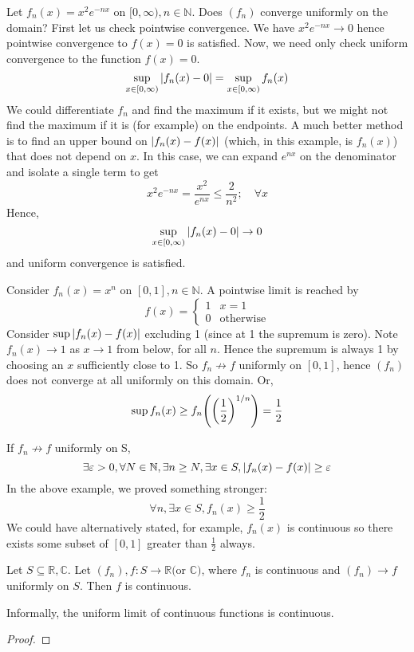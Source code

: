 \begin{example}
	Let \( f_n(x) = x^2 e^{-nx} \) on \( [0, \infty), n \in \mathbb N \).
	Does \( (f_n) \) converge uniformly on the domain?
	First let us check pointwise convergence.
	We have \( x^2 e^{-nx} \to 0 \) hence pointwise convergence to \( f(x) = 0 \) is satisfied.
	Now, we need only check uniform convergence to the function \( f(x) = 0 \).
	\[
		\sup_{x \in [0, \infty)} \abs{f_n(x) - 0} = \sup_{x \in [0, \infty)} f_n(x)
	\]
	We could differentiate \( f_n \) and find the maximum if it exists, but we might not find the maximum if it is (for example) on the endpoints.
	A much better method is to find an upper bound on \( \abs{f_n(x)-f(x)} \) (which, in this example, is \( f_n(x) \)) that does not depend on \( x \).
	In this case, we can expand \( e^{nx} \) on the denominator and isolate a single term to get
	\[
		x^2 e^{-nx} = \frac{x^2}{e^{nx}} \leq \frac{2}{n^2};\quad \forall x
	\]
	Hence,
	\[
		\sup_{x \in [0, \infty)} \abs{f_n(x) - 0} \to 0
	\]
	and uniform convergence is satisfied.
\end{example}
\begin{example}
	Consider \( f_n(x) = x^n \) on \( [0,1], n \in \mathbb N \).
	A pointwise limit is reached by
	\[
		f(x) = \begin{cases}
			1 & x = 1            \\
			0 & \text{otherwise}
		\end{cases}
	\]
	Consider \( \sup \abs{f_n(x) - f(x)} \) excluding 1 (since at 1 the supremum is zero).
	Note \( f_n(x) \to 1 \) as \( x \to 1 \) from below, for all \( n \).
	Hence the supremum is always 1 by choosing an \( x \) sufficiently close to 1.
	So \( f_n \not\to f \) uniformly on \( [0,1] \), hence \( (f_n) \) does not converge at all uniformly on this domain.
	Or,
	\[
		\sup f_n(x) \geq f_n\qty(\qty(\frac{1}{2})^{1/n}) = \frac{1}{2}
	\]
\end{example}

\begin{remark}
	If \(f_n \not\to f\) uniformly on S,
	\[
		\exists \varepsilon > 0, \forall N \in \mathbb N, \exists n \geq N, \exists x \in S, \abs{f_n(x) - f(x)} \geq \varepsilon
	\]
	In the above example, we proved something stronger:
	\[
		\forall n, \exists x \in S, f_n(x) \geq \frac{1}{2}
	\]
	We could have alternatively stated, for example, \( f_n(x) \) is continuous so there exists some subset of \( [0, 1] \) greater than \( \frac{1}{2} \) always.
\end{remark}

\begin{theorem}
	Let \( S \subseteq \mathbb R, \mathbb C \).
	Let \( (f_n), f \colon S \to \mathbb R \text{(or } \mathbb{C} \text{)} \), where \( f_n \) is continuous and \( (f_n) \to f \) uniformly on \( S \).
	Then \( f \) is continuous.
\end{theorem}
\noindent Informally, the uniform limit of continuous functions is continuous.
\begin{proof}

\end{proof}
